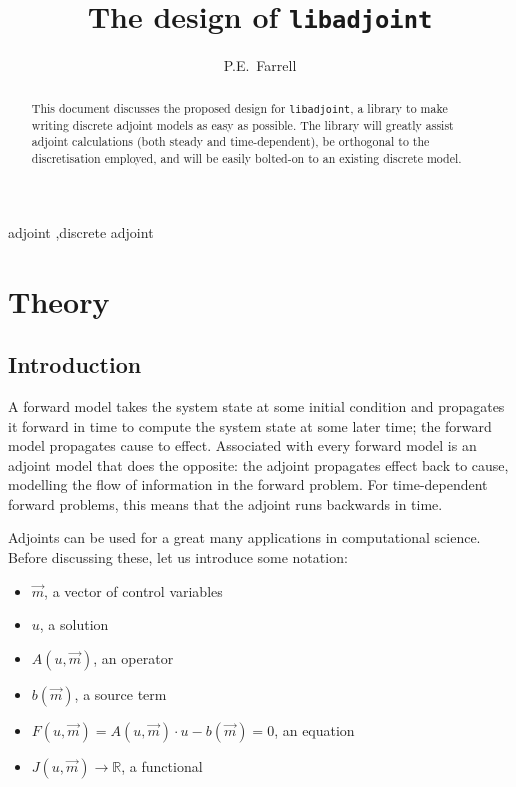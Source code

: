 \documentclass[10pt,authoryear]{elsarticle}
\newcommand{\m}[0]{{\vec{m}}}
\newcommand{\libadjoint}[0]{{\texttt{libadjoint}}}
\begin{document}
  \begin{frontmatter}
    \title{The design of \libadjoint}

    \author[ad1]{P.E.\ Farrell}
    \address[ad1]{Applied Modelling and Computation Group,\\
      Department of Earth Science and Engineering,\\
      Royal School of Mines,\\
      Imperial College London, London, SW7 2AZ, UK\\
      \texttt{\emph{http://amcg.ese.ic.ac.uk}}}
    \begin{abstract}
This document discusses the proposed design for \libadjoint, a library to make
writing discrete adjoint models as easy as possible. The library will greatly assist
adjoint calculations (both steady and time-dependent), be orthogonal to the discretisation employed,
and will be easily bolted-on to an existing discrete model.
    \end{abstract}
    \begin{keyword}
      adjoint \sep discrete adjoint 
    \end{keyword}

  \end{frontmatter}

  \setcounter{section}{0}
  \setcounter{equation}{0}

\tableofcontents

\section{Theory}
\subsection{Introduction}

A forward model takes the system state at some initial condition and propagates it forward in time
to compute the system state at some later time; the forward model propagates cause to effect.
Associated with every forward model is an adjoint model that does the opposite: the adjoint propagates effect back to cause,
modelling the flow of information in the forward problem. For time-dependent forward problems, this means that
the adjoint runs backwards in time.

Adjoints can be used for a great many applications in computational science. Before discussing these, let us introduce some notation:
\begin{itemize}
\item $\m$, a vector of control variables
\item $u$, a solution
\item $A(u, \m)$, an operator
\item $b(\m)$, a source term
\item $F(u, \m) = A(u, \m)\cdot u - b(\m) = 0$, an equation
\item $J(u, \m) \rightarrow \mathbb{R}$, a functional
\end{itemize}
\end{document}
